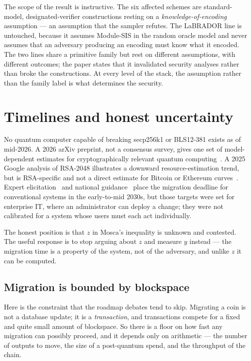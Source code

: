 The scope of the result is instructive. The six affected schemes are
standard-model, designated-verifier constructions resting on a
\emph{knowledge-of-encoding} assumption --- an assumption that the sampler
refutes. The LaBRADOR line is untouched, because it assumes Module-SIS in the
random oracle model and never assumes that an adversary producing an encoding
must know what it encoded. The two lines share a primitive family but rest on
different assumptions, with different outcomes; the paper states that it
invalidated security analyses rather than broke the constructions. At every
level of the stack, the assumption rather than the family label is what
determines the security.

\section{Timelines and honest uncertainty}
No quantum computer capable of breaking secp256k1 or BLS12-381 exists as of mid-2026.
A 2026 arXiv preprint, not a consensus survey, gives one set of model-dependent
estimates for cryptographically relevant quantum computing~\cite{quantumhorizon2026}.
A 2025 Google analysis of RSA-2048 illustrates a downward resource-estimation trend,
but is RSA-specific and not a direct estimate for Bitcoin or Ethereum curves~\cite{gidney2025}.
Expert elicitation~\cite{mosca2025} and national guidance~\cite{nistir8547,ncscpqc2025,cnsa2}
place the migration deadline for conventional systems in the early-to-mid 2030s,
but those targets were set for enterprise IT, where an administrator can deploy a
change; they were not calibrated for a system whose users must each act
individually.

The honest position is that $z$ in Mosca's inequality is unknown and contested.
The useful response is to stop arguing about $z$ and measure $y$ instead --- the
migration time is a property of the system, not of the adversary, and unlike $z$
it can be computed.

\subsection{Migration is bounded by blockspace}
\label{sec:migration-throughput}

Here is the constraint that the roadmap debates tend to skip. Migrating a coin is
not a database update; it is a \emph{transaction}, and transactions compete for a
fixed and quite small amount of blockspace. So there is a floor on how fast any
migration can possibly proceed, and it depends only on arithmetic --- the number
of outputs to move, the size of a post-quantum spend, and the throughput of the
chain.

